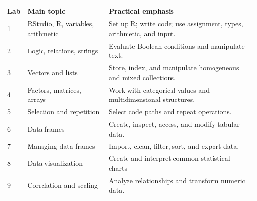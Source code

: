 \begin{dstable}
\begin{tabularx}{\linewidth}{@{}p{1.4cm}p{4.1cm}X@{}}
\toprule
\rowcolor{DSPaleBlue!92}
Lab & Main topic & Practical emphasis \\
\midrule
1 & RStudio, R, variables, arithmetic & Set up R; write code; use assignment, types, arithmetic, and input. \\
2 & Logic, relations, strings & Evaluate Boolean conditions and manipulate text. \\
3 & Vectors and lists & Store, index, and manipulate homogeneous and mixed collections. \\
4 & Factors, matrices, arrays & Work with categorical values and multidimensional structures. \\
5 & Selection and repetition & Select code paths and repeat operations. \\
6 & Data frames & Create, inspect, access, and modify tabular data. \\
7 & Managing data frames & Import, clean, filter, sort, and export data. \\
8 & Data visualization & Create and interpret common statistical charts. \\
9 & Correlation and scaling & Analyze relationships and transform numeric data. \\
\bottomrule
\end{tabularx}
\end{dstable}
